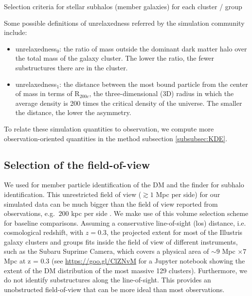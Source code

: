 \begin{table*}
\begin{center}
	\caption{ Selection criteria for stellar subhalos (member galaxies) for each
		cluster / group 
\label{tab:member_galaxy_selections}} 
  
\end{center} 
\end{table*}
Some possible definitions of unrelaxedness referred by the simulation community
include:
\begin{itemize}
	\item unrelaxedness$_0$: the ratio of mass outside the dominant dark matter halo over the total mass
		of the galaxy cluster. The lower the ratio, the fewer substructures there
		are in the cluster. 
	\item unrelaxedness$_1$: the distance between the most bound particle from
		the center of mass in terms of R$_{200c}$, the three-dimensional (3D) radius in which the
		average density is 200 times the critical density of the universe. 
		The smaller the distance, the lower the asymmetry. 
\end{itemize}
To relate these simulation quantities to observation, 
we compute more observation-oriented 
quantities in the method subsection \ref{subsubsec:KDE}. 

\subsection{Selection of the field-of-view}
\label{sec:FOV}


We used {} for member particle identification of the DM and the 
{} finder for subhalo identification.
This unrestricted field of view ($\gtrsim 1$ Mpc per side) for our simulated data can be much bigger than
the field of view reported from
observations, e.g. $~200$ kpc per side \citep{Zitrin2012a}. We make use of this volume selection scheme
for baseline comparisons. Assuming a conservative line-of-sight (los) distance, 
i.e. cosmological redshift, with  $z = 0.3$, 
the projected extent for most of the Illustris galaxy clusters and groups
fits inside the field of view of different instruments, such as the Subaru Suprime Camera,
which covers a physical area of $\sim 9$ Mpc $\times 7$ Mpc at z = 0.3 
(see \href{https://goo.gl/ClZNvM}{https://goo.gl/ClZNvM} for a Jupyter notebook 
showing the extent of the DM distribution of the most massive 129
clusters). Furthermore, we do not identify substructures along the line-of-sight.
This provides an unobstructed field-of-view that can be more ideal than most observations.

